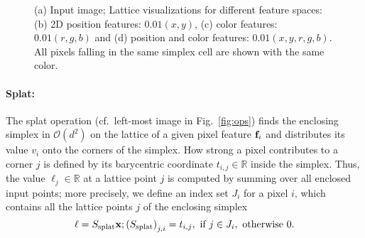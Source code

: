 \begin{figure}[t]
  \centering
  {(a) Input image; Lattice visualizations for different feature spaces: (b) 2D position features: $0.01(x, y)$,
  (c) color features: $0.01(r, g, b)$ and (d) position and color features: $0.01(x, y, r, g, b)$. All pixels
  falling in the same simplex cell are shown with the same color.}
\label{fig:lattice}
\end{figure}

\paragraph{Splat:} The splat operation (cf.\ left-most image in
Fig.~\ref{fig:ops}) finds the enclosing simplex in $\mathcal{O}(d^2)$ on the
lattice of a given pixel feature $\mathbf{f}_i$ and distributes its value $v_i$ onto the corners of the
simplex. How strong a pixel contributes to a corner $j$ is defined by its
barycentric coordinate $t_{i,j}\in\mathbb{R}$ inside the simplex.
Thus, the value $\mathbf{\ell}_j \in \mathbb{R}$ at a lattice point
$j$ is computed by summing over all enclosed input points; more precisely, we
define an index set $J_i$ for a pixel $i$, which contains all the lattice points
$j$ of the enclosing simplex
\vspace{-0.7em}
\begin{equation}
  \label{eq:splat}
  \mathbf{\ell} = S_{\text{splat}} \bv;%
  {(S_{\text{splat}})}_{j, i} = t_{i, j}, \text{ if } j\in J_i, \text{ otherwise } 0.
\vspace{-0.5em}
\end{equation}

\vspace{-0.3cm}
